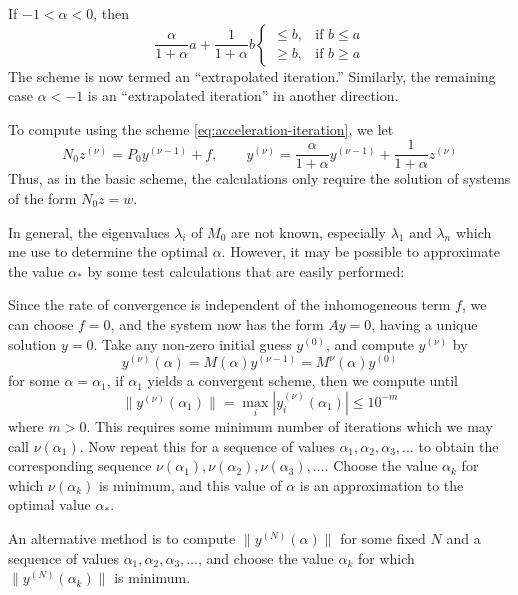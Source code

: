 \documentclass[../main.tex]{subfiles}
\begin{document}
If $-1 < \alpha < 0$, then
\begin{equation*}
	\frac{\alpha}{1 + \alpha} a + \frac{1}{1 + \alpha} b
	\begin{cases}
		\leq b, & \text{if $b \leq a$} \\
		\geq b, & \text{if $b \geq a$}
	\end{cases}
\end{equation*}
The scheme is now termed an ``extrapolated iteration.'' Similarly, the remaining case $\alpha < -1$ is an ``extrapolated iteration'' in another direction.

To compute using the scheme \eqref{eq:acceleration-iteration}, we let
\begin{equation*}
	N_0 z^{(\nu)} = P_0 y^{(\nu-1)} + f, \qquad y^{(\nu)} = \frac{\alpha}{1 + \alpha} y^{(\nu-1)} + \frac{1}{1 + \alpha} z^{(\nu)}
\end{equation*}
Thus, as in the basic scheme, the calculations only require the solution of systems of the form $N_0 z = w$.

In general, the eigenvalues $\lambda_i$ of $M_0$ are not known, especially $\lambda_1$ and $\lambda_n$ which me use to determine the optimal $\alpha$. However, it may be possible to approximate the value $\alpha_*$ by some test calculations that are easily performed:

Since the rate of convergence is independent of the inhomogeneous term $f$, we can choose $f = 0$, and the system now has the form $A y = 0$, having a unique solution $y = 0$. Take any non-zero initial guess $y^{(0)}$, and compute $y^{(\nu)}$ by
\begin{equation*}
	y^{(\nu)} (\alpha) = M(\alpha) y^{(\nu-1)} = M^{\nu}(\alpha) y^{(0)}
\end{equation*}
for some $\alpha = \alpha_1$, if $\alpha_1$ yields a convergent scheme, then we compute until
\begin{equation*}
	\| y^{(\nu)} (\alpha_1) \| = \max_i | y_i^{(\nu)} (\alpha_1) | \leq 10^{-m}
\end{equation*}
where $m>0$. This requires some minimum number of iterations which we may call $\nu(\alpha_1)$. Now repeat this for a sequence of values $\alpha_1, \alpha_2, \alpha_3, \ldots$ to obtain the corresponding sequence $\nu(\alpha_1), \nu(\alpha_2), \nu(\alpha_3), \ldots$. Choose the value $\alpha_k$ for which $\nu(\alpha_k)$ is minimum, and this value of $\alpha$ is an approximation to the optimal value $\alpha_*$.

An alternative method is to compute $\| y^{(N)} (\alpha) \|$ for some fixed $N$ and a sequence of values $\alpha_1, \alpha_2, \alpha_3, \ldots$, and choose the value $\alpha_k$ for which $\| y^{(N)} (\alpha_k) \|$ is minimum.
\end{document}
